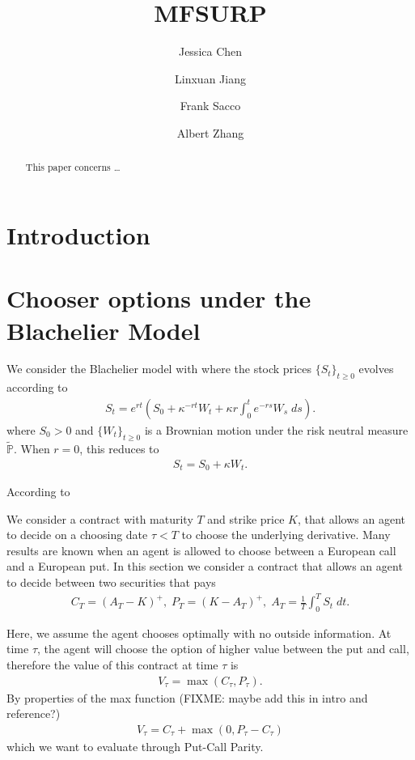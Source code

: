 \documentclass[reqno]{amsart}
\title{MFSURP}
\author{Jessica Chen}
\author{Linxuan Jiang}
\author{Frank Sacco}
\author{Albert Zhang}
\begin{document}
\begin{abstract}
    This paper concerns \dots 
\end{abstract}



\maketitle  
\tableofcontents

\section{Introduction}


\section{Chooser options under the Blachelier Model}
We consider the Blachelier model with where the stock prices $\{S_t\}_{t \ge 0}$ evolves according to 
\begin{align}\label{eq: r not 0}
	 S_t = e^{rt} \left( S_0 + \kappa^{-rt}W_t + \kappa r \int_0^t e^{-rs} W_s \; ds \right).
\end{align}
where $S_0 > 0$ and $\{W_t\}_{t \ge 0}$ is a Brownian motion under the risk neutral measure $\tilde{\mathbb{P}}$. When $r = 0$, this reduces to 
\begin{align}\label{eq: r=0}
      S_t = S_0 + \kappa W_t. 
\end{align}

According to 


We consider a contract with maturity $T$ and strike price $K$, that allows an agent to decide on a choosing date $\tau < T$ to choose the underlying derivative. Many results are known when an agent is allowed to choose between a European call and a European put. In this section we consider a contract that allows an agent to decide between two securities that pays 
\begin{align}
     C_T = (A_T - K)^+, \; P_T = (K - A_T)^+, \; A_T = \frac{1}{T} \int_0^T S_t \; dt.
\end{align}

Here, we assume the agent chooses optimally with no outside information. At time $\tau$, the agent will choose the option of higher value between the put and call, therefore the value of this contract at time $\tau$ is 
\begin{align}
     V_\tau = \max(C_\tau, P_\tau).
\end{align}
By properties of the max function (FIXME: maybe add this in intro and reference?)
\begin{align}
     V_\tau = C_\tau + \max(0, P_\tau - C_\tau)
\end{align}
which we want to evaluate through Put-Call Parity.
\end{document}
